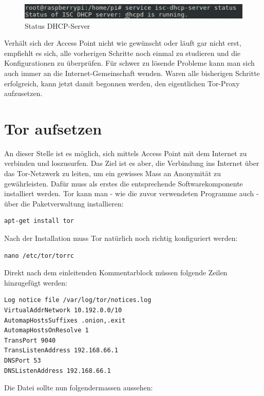 \begin{figure}[H]
\centering
\includegraphics[scale=0.7]{images/dhcp_status}
\caption{Status DHCP-Server}
\end{figure}

Verhält sich der Access Point nicht wie gewünscht oder läuft gar nicht erst, empfiehlt es sich, alle vorherigen Schritte noch einmal zu studieren und die Konfigurationen zu überprüfen. Für schwer zu lösende Probleme kann man sich auch immer an die Internet-Gemeinschaft wenden. Waren alle bisherigen Schritte erfolgreich, kann jetzt damit begonnen werden, den eigentlichen Tor-Proxy aufzusetzen.

\section{Tor aufsetzen}
An dieser Stelle ist es möglich, sich mittels Access Point mit dem Internet zu verbinden und loszusurfen. Das Ziel ist es aber, die Verbindung ins Internet über das Tor-Netzwerk zu leiten, um ein gewisses Mass an Anonymität zu gewährleisten. Dafür muss als erstes die entsprechende Softwarekomponente installiert werden. Tor kann man - wie die zuvor verwendeten Programme auch - über die Paketverwaltung installieren:

\begin{lstlisting}
apt-get install tor
\end{lstlisting}

Nach der Installation muss Tor natürlich noch richtig konfiguriert werden: 

\begin{lstlisting}
nano /etc/tor/torrc
\end{lstlisting} 

Direkt nach dem einleitenden Kommentarblock müssen folgende Zeilen hinzugefügt werden:

\begin{lstlisting}
Log notice file /var/log/tor/notices.log
VirtualAddrNetwork 10.192.0.0/10
AutomapHostsSuffixes .onion,.exit
AutomapHostsOnResolve 1
TransPort 9040
TransListenAddress 192.168.66.1
DNSPort 53
DNSListenAddress 192.168.66.1
\end{lstlisting}

Die Datei sollte nun folgendermassen aussehen: 

